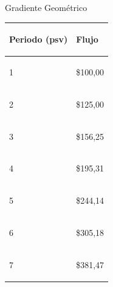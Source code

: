 \item Gradiente Geométrico
\begin{spacing}{0.1}
\begin{center}
\begin{tabular}{ |p{3.5cm}| p{3cm}|}
\hline 
\begin{center}\textbf{Periodo (psv) } \end{center}  & \begin{center} \textbf{Flujo} \end{center}  \\ \hline

\begin{center}1 \end{center}    &  \begin{center} \$100,00\end{center} \\ \hline

\begin{center}2 \end{center}    &  \begin{center} \$125,00\end{center} \\ \hline 

\begin{center}3 \end{center}    & \begin{center} \$156,25 \end{center}  \\ \hline

\begin{center}4 \end{center}    & \begin{center} \$195,31\end{center}  \\ \hline

\begin{center}5 \end{center}    & \begin{center} \$244,14 \end{center}  \\ \hline

\begin{center}6 \end{center}    & \begin{center} \$305,18 \end{center}  \\ \hline

\begin{center}7 \end{center}    & \begin{center} \$381,47\end{center}  \\ \hline


\end{tabular}
\end{center}
\end{spacing}
